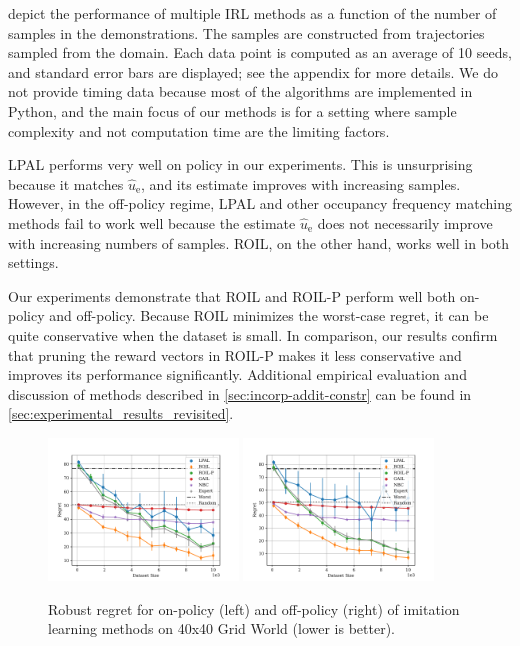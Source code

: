 \documentclass[10pt]{article}
\theoremstyle{plain}
\theoremstyle{remark}
\begin{document}
 depict the performance of multiple IRL methods as a function of the number of samples in the demonstrations. The samples are constructed from trajectories sampled from the domain. Each data point is computed as an average of 10 seeds, and standard error bars are displayed; see the appendix for more details. We do not provide timing data because most of the algorithms are implemented in Python, and the main focus of our methods is for a setting where sample complexity and not computation time are the limiting factors. 

LPAL performs very well on policy in our experiments. This is unsurprising because it matches $\hat{u}_{\mathrm{e}}$, and its estimate improves with increasing samples. However, in the off-policy regime, LPAL and other occupancy frequency matching methods fail to work well because the estimate $\hat{u}_{\mathrm{e}}$ does not necessarily improve with increasing numbers of samples. ROIL, on the other hand, works well in both settings. 

Our experiments demonstrate that ROIL and ROIL-P perform well both on-policy and off-policy. Because ROIL minimizes the worst-case regret, it can be quite conservative when the dataset is small. In comparison, our results confirm that pruning the reward vectors in ROIL-P makes it less conservative and improves its performance significantly. Additional empirical evaluation and discussion of methods described in \cref{sec:incorp-addit-constr} can be found in \cref{sec:experimental_results_revisited}. 

\begin{figure}
\centering 
\includegraphics[width=0.45\textwidth]{../src/plots/regrets/40x40_gridworld_on_policy_regret_regrets.pdf} 
\includegraphics[width=0.45\textwidth]{../src/plots/regrets/40x40_gridworld_off_policy_regret_regrets.pdf}
\caption{Robust regret for on-policy (left) and off-policy (right) of imitation learning methods on 40x40 Grid World (lower is better).}
\label{fig:grid-regret}
\end{figure}
\end{document}
